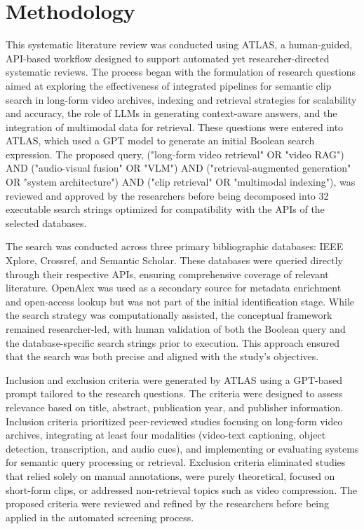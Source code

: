 \documentclass[conference]{IEEEtran}
\begin{document}
\section{Methodology}
This systematic literature review was conducted using ATLAS, a human-guided, API-based workflow designed to support automated yet researcher-directed systematic reviews. The process began with the formulation of research questions aimed at exploring the effectiveness of integrated pipelines for semantic clip search in long-form video archives, indexing and retrieval strategies for scalability and accuracy, the role of LLMs in generating context-aware answers, and the integration of multimodal data for retrieval. These questions were entered into ATLAS, which used a GPT model to generate an initial Boolean search expression. The proposed query, ("long-form video retrieval" OR "video RAG") AND ("audio-visual fusion" OR "VLM") AND ("retrieval-augmented generation" OR "system architecture") AND ("clip retrieval" OR "multimodal indexing"), was reviewed and approved by the researchers before being decomposed into 32 executable search strings optimized for compatibility with the APIs of the selected databases.

The search was conducted across three primary bibliographic databases: IEEE Xplore, Crossref, and Semantic Scholar. These databases were queried directly through their respective APIs, ensuring comprehensive coverage of relevant literature. OpenAlex was used as a secondary source for metadata enrichment and open-access lookup but was not part of the initial identification stage. While the search strategy was computationally assisted, the conceptual framework remained researcher-led, with human validation of both the Boolean query and the database-specific search strings prior to execution. This approach ensured that the search was both precise and aligned with the study's objectives.

Inclusion and exclusion criteria were generated by ATLAS using a GPT-based prompt tailored to the research questions. The criteria were designed to assess relevance based on title, abstract, publication year, and publisher information. Inclusion criteria prioritized peer-reviewed studies focusing on long-form video archives, integrating at least four modalities (video-text captioning, object detection, transcription, and audio cues), and implementing or evaluating systems for semantic query processing or retrieval. Exclusion criteria eliminated studies that relied solely on manual annotations, were purely theoretical, focused on short-form clips, or addressed non-retrieval topics such as video compression. The proposed criteria were reviewed and refined by the researchers before being applied in the automated screening process.
\end{document}
